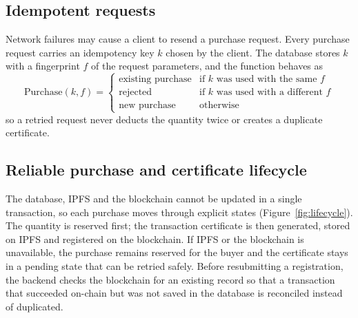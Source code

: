 \subsection*{Idempotent requests}
Network failures may cause a client to resend a purchase request. Every purchase request carries an idempotency key $k$ chosen by the client. The database stores $k$ with a fingerprint $f$ of the request parameters, and the function behaves as
\begin{equation} \label{eq:idem}
	\text{Purchase}(k, f) =
	\begin{cases}
		\text{existing purchase} & \text{if } k \text{ was used with the same } f\\
		\text{rejected} & \text{if } k \text{ was used with a different } f\\
		\text{new purchase} & \text{otherwise}
	\end{cases}
\end{equation}
so a retried request never deducts the quantity twice or creates a duplicate certificate.

\subsection*{Reliable purchase and certificate lifecycle}
The database, IPFS and the blockchain cannot be updated in a single transaction, so each purchase moves through explicit states (Figure~\ref{fig:lifecycle}). The quantity is reserved first; the transaction certificate is then generated, stored on IPFS and registered on the blockchain. If IPFS or the blockchain is unavailable, the purchase remains reserved for the buyer and the certificate stays in a pending state that can be retried safely. Before resubmitting a registration, the backend checks the blockchain for an existing record so that a transaction that succeeded on-chain but was not saved in the database is reconciled instead of duplicated.

